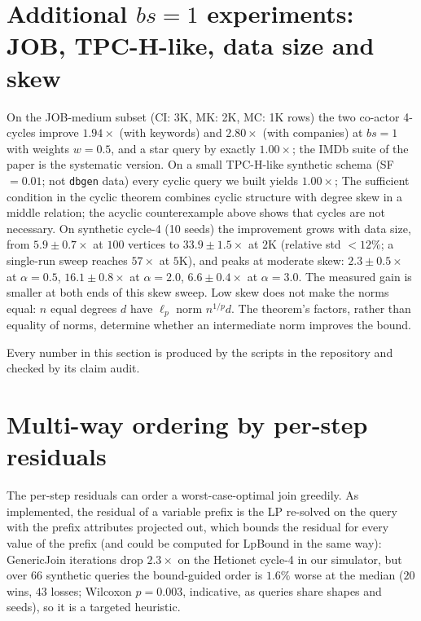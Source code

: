 \documentclass[11pt]{article}
\begin{document}
\section{Additional $bs=1$ experiments: JOB, TPC-H-like, data size and skew}

On the JOB-medium subset (CI: 3K, MK: 2K, MC: 1K rows) the two co-actor
4-cycles improve $1.94\times$ (with keywords) and $2.80\times$ (with
companies) at $bs=1$ with weights $w{=}0.5$, and a star query by
exactly $1.00\times$; the IMDb suite of the paper is the
systematic version. On a small TPC-H-like synthetic schema (SF${=}0.01$; not \texttt{dbgen} data) every cyclic query we built yields $1.00\times$; The sufficient condition in the cyclic theorem combines cyclic structure with degree skew in a middle relation; the acyclic counterexample above shows that cycles are not necessary. On synthetic cycle-4 (10 seeds) the improvement grows
with data size, from $5.9{\pm}0.7\times$ at $100$ vertices to
$33.9{\pm}1.5\times$ at $2$K (relative std ${<}12\%$; a single-run sweep
reaches $57\times$ at $5$K), and peaks at moderate skew: $2.3{\pm}0.5\times$
at $\alpha{=}0.5$, $16.1{\pm}0.8\times$ at $\alpha{=}2.0$,
$6.6{\pm}0.4\times$ at $\alpha{=}3.0$. The measured gain is smaller at both ends of this skew sweep. Low skew does not make the norms equal: $n$ equal degrees $d$ have $\ell_p$ norm $n^{1/p}d$. The theorem's factors, rather than equality of norms, determine whether an intermediate norm improves the bound.

Every number in this section is produced by the scripts in the repository
and checked by its claim audit.

\section{Multi-way ordering by per-step residuals}
The per-step residuals can order a
worst-case-optimal join greedily. As implemented, the residual of a variable
prefix is the LP re-solved on the query with the prefix attributes projected
out, which bounds the residual for every value of the prefix (and could be
computed for LpBound in the same way): GenericJoin iterations drop $2.3\times$
on the Hetionet cycle-4 in our simulator, but over $66$ synthetic queries
the bound-guided order is $1.6\%$ worse at the median ($20$ wins, $43$
losses; Wilcoxon $p{=}0.003$, indicative, as queries share shapes and
seeds), so it is a targeted heuristic.
\end{document}
